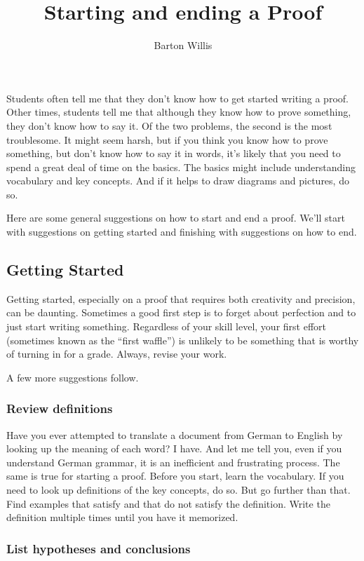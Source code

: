\documentclass[12pt,fleqn]{article}
\title{Starting and ending a Proof}
\author{Barton Willis}
\newcounter{ex}\setcounter{ex}{0}
\newcounter{se}\setcounter{se}{0}
\begin{document}
\maketitle

Students often tell me that they don't know how to get started writing a proof. Other times, students tell me that although they know how to prove something, they don't know how to say it. Of the two problems, the second is the most troublesome. It
might seem harsh, but if you think you know how to prove something, but don't know how to say it in words, it's likely that 
you need to spend a great deal of time on the basics. The basics might include
understanding vocabulary and key concepts. And if it helps
to draw diagrams and pictures, do so.

Here are some general suggestions on how to start and end a proof. We'll start with suggestions on 
getting started and finishing with suggestions on how to end.

\subsection{Getting Started}

Getting started, especially on a proof that requires both
creativity and precision, can be daunting.  Sometimes a good first step is to forget about 
perfection and to just start writing something. Regardless of your
skill level, your first effort (sometimes known as the “first waffle”)
is unlikely to be something that is worthy of turning in for a grade.
Always, revise your work.

A few more suggestions follow.

\subsubsection{Review definitions} 

Have you ever attempted to translate a 
document from German to English by looking up the meaning of each 
word? I have. And let me tell you, even if you understand German grammar, 
 it is an inefficient and frustrating process. The same is true
 for starting a proof. Before you start, learn the vocabulary. If you 
 need to look up definitions of the key concepts, do so. But go further than that. 
 Find examples that satisfy and that do not satisfy the definition. Write the
 definition multiple times until you have it memorized.

 \subsubsection{List hypotheses and conclusions} 
\end{document}
